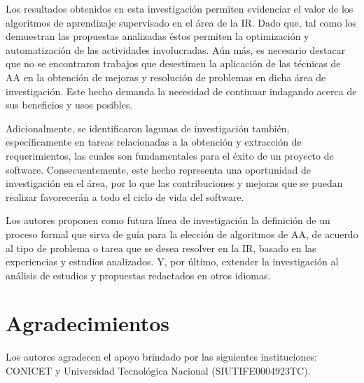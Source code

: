 \documentclass[journal]{IEEEtran}
\begin{document}
Los resultados obtenidos en esta investigación permiten evidenciar el valor de los algoritmos de aprendizaje supervisado en el área de la IR. Dado que, tal como los demuestran las propuestas analizadas éstos permiten la optimización y automatización de las actividades involucradas. Aún más, es necesario destacar que no se encontraron trabajos que desestimen la aplicación de las técnicas de AA en la obtención de mejoras y resolución de problemas en dicha área de investigación. Este hecho demanda la necesidad de continuar indagando acerca de sus beneficios y usos posibles.

Adicionalmente, se identificaron lagunas de investigación también, específicamente en tareas relacionadas a la obtención y extracción de requerimientos, las cuales son fundamentales para el éxito de un proyecto de software. Consecuentemente, este hecho representa una oportunidad de investigación en el área, por lo que  las contribuciones y mejoras que se puedan realizar favorecerán a todo el ciclo de vida del software.  

Los autores proponen como futura línea de investigación la definición de un proceso formal que sirva de guía para la elección de algoritmos de AA, de acuerdo al tipo de problema o tarea que se desea resolver en la IR, basado en las experiencias y estudios analizados. Y, por último, extender la investigación al análisis de estudios y propuestas redactados en otros idiomas.   

\section*{Agradecimientos}

Los autores agradecen el apoyo brindado por las siguientes instituciones: CONICET y Universidad Tecnológica Nacional (SIUTIFE0004923TC).


\ifCLASSOPTIONcaptionsoff
  \newpage
\fi



%
%
%
\end{document}

